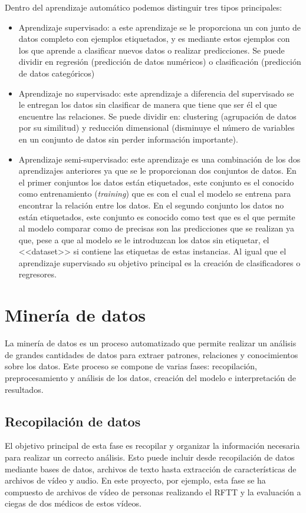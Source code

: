 Dentro del aprendizaje automático podemos distinguir tres tipos principales:
\begin{itemize}
\item Aprendizaje supervisado: a este aprendizaje se le proporciona un con junto de datos completo con ejemplos etiquetados, y es mediante estos ejemplos con los que aprende a clasificar nuevos datos o realizar predicciones. Se puede dividir en regresión (predicción de datos numéricos) o clasificación (predicción de datos categóricos)
\item Aprendizaje no supervisado: este aprendizaje a diferencia del supervisado se le entregan los datos sin clasificar de manera que tiene que ser él el que encuentre las relaciones. Se puede dividir en: clustering (agrupación de datos por su similitud) y reducción dimensional (disminuye el número de variables en un conjunto de datos sin perder información importante).
\item Aprendizaje semi-supervisado: este aprendizaje es una combinación de los dos aprendizajes anteriores ya que se le proporcionan dos conjuntos de datos. En el primer conjuntos los datos están etiquetados, este conjunto es el conocido como entrenamiento (\textit{training}) que es con el cual el modelo se entrena para encontrar la relación entre los datos. En el segundo conjunto los datos no están etiquetados, este conjunto es conocido como test que es el que permite al modelo comparar como de precisas son las predicciones que se realizan ya que, pese a que al modelo se le introduzcan los datos sin etiquetar, el <<dataset>> si contiene las etiquetas de estas instancias. Al igual que el aprendizaje supervisado su objetivo principal es la creación de clasificadores o regresores.
\end{itemize}

\section{Minería de datos}

La minería de datos es un proceso automatizado que permite realizar un análisis de grandes cantidades de datos para extraer patrones, relaciones y conocimientos sobre los datos. Este proceso se compone de varias fases: recopilación, preprocesamiento y análisis de los datos, creación del modelo e interpretación de resultados.

\subsection{Recopilación de datos}
El objetivo principal de esta fase es recopilar y organizar la información necesaria para realizar un correcto análisis. Esto puede incluir desde recopilación de datos mediante bases de datos, archivos de texto hasta extracción de características de archivos de vídeo y audio. En este proyecto, por ejemplo, esta fase se ha compuesto de archivos de vídeo de personas realizando el RFTT y la evaluación a ciegas de dos médicos de estos vídeos.


